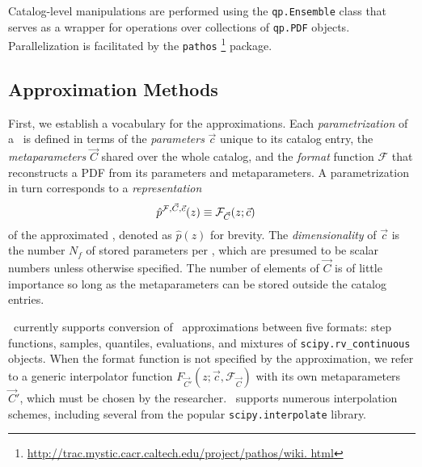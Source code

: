 Catalog-level manipulations are performed using the \texttt{qp.Ensemble} class 
that serves as a wrapper for operations over collections of \texttt{qp.PDF} 
objects.
Parallelization is facilitated by the \texttt{pathos} 
\footnote{\noindent\url{http://trac.mystic.cacr.caltech.edu/project/pathos/wiki.
		html}} \citep{mckerns_building_2012, mckerns_pathos:_2010} package.

\subsection{Approximation Methods}

First, we establish a vocabulary for the approximations.
Each \textit{parametrization} of a \pz\ is defined in terms of the 
\textit{parameters} $\vec{c}$ unique to its catalog entry, the 
\textit{metaparameters} $\vec{C}$ shared over the whole catalog, and the 
\textit{format} function $\mathcal{F}$ that reconstructs a PDF from its 
parameters and metaparameters.
A parametrization in turn corresponds to a \textit{representation}
\begin{align}
\eqlabel{eq:definition}
\hat{p}^{\mathcal{F}, \vec{C}, \vec{c}}(z) &\equiv \mathcal{F}_{\vec{C}}(z; 
\vec{c})
\end{align}
of the approximated \pz, denoted as $\hat{p}(z)$ for brevity.
The \textit{dimensionality} of $\vec{c}$ is the number $N_{f}$ of stored 
parameters per \pz, which are presumed to be scalar numbers unless otherwise 
specified.
The number of elements of $\vec{C}$ is of little importance so long as the 
metaparameters can be stored outside the catalog entries.

\qp\ currently supports conversion of \pz\ approximations between five formats: 
step functions, samples, quantiles, evaluations, and mixtures of 
\texttt{scipy.rv\_continuous} objects.
When the format function is not specified by the approximation, we refer to a 
generic interpolator function $F_{\vec{C}'}(z; \vec{c}, \mathcal{F}_{\vec{C}})$ 
with its own metaparameters $\vec{C}'$, which must be chosen by the researcher.
\qp\ supports numerous interpolation schemes, including several from the 
popular \texttt{scipy.interpolate} library.

